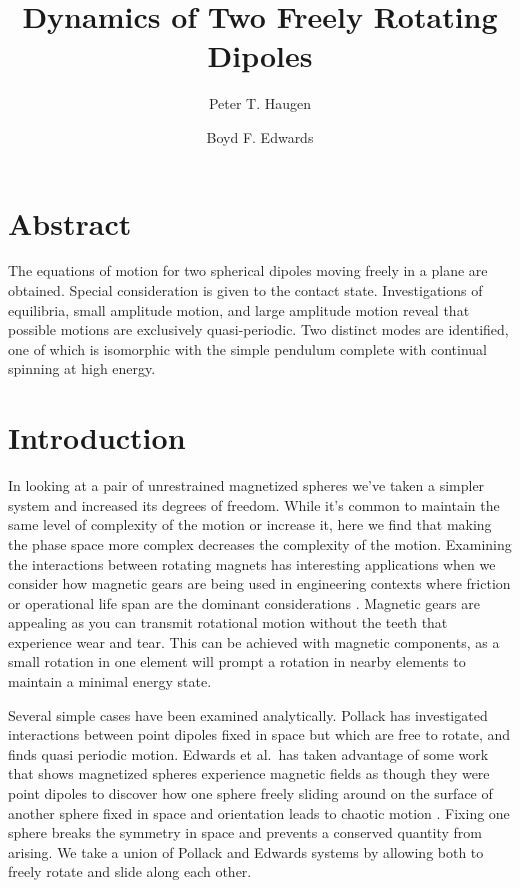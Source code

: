 \documentclass[prbg,preprint]{revtex4-1}
\begin{document}
\title{Dynamics of Two Freely Rotating Dipoles}
\author{Peter T. Haugen}
\author{Boyd F. Edwards}

\maketitle
\section{Abstract}
	The equations of motion for two spherical dipoles moving freely in a plane are obtained. Special consideration is given to the contact state. Investigations of equilibria, small amplitude motion, and large amplitude motion reveal that possible motions are exclusively quasi-periodic.
	Two distinct modes are identified, one of which is isomorphic with the simple pendulum complete with continual spinning at high energy.
	
	

\section{Introduction}

In looking at a pair of unrestrained magnetized spheres we've taken a simpler system and increased its degrees of freedom.
While it's common to maintain the same level of complexity of the motion or increase it, here we find that making the phase space more complex decreases the complexity of the motion.
Examining the interactions between rotating magnets has interesting applications when we consider how magnetic gears \cite{doi:10.1119/1.5029823} are being used in engineering contexts where friction or operational life span are the dominant considerations \cite{Modaresahmadi:2019aa}.
Magnetic gears are appealing as you can transmit rotational motion without the teeth that experience wear and tear.
This can be achieved with magnetic components, as a small rotation in one element will prompt a rotation in nearby elements to maintain a minimal energy state.

Several simple cases have been examined analytically.
Pollack \cite{doi:10.1139/p96-151} has investigated interactions between point dipoles fixed in space but which are free to rotate, and finds quasi periodic motion.
Edwards et al.\ has taken advantage of some work that shows magnetized spheres experience magnetic fields as though they were point dipoles \cite{Edwards:2017aa} to discover how one sphere freely sliding around on the surface of another sphere fixed in space and orientation leads to chaotic motion \cite{Edwards:2017ab}.
Fixing one sphere breaks the symmetry in space and prevents a conserved quantity from arising.
We take a union of Pollack and Edwards systems by allowing both to freely rotate and slide along each other.
\end{document}
